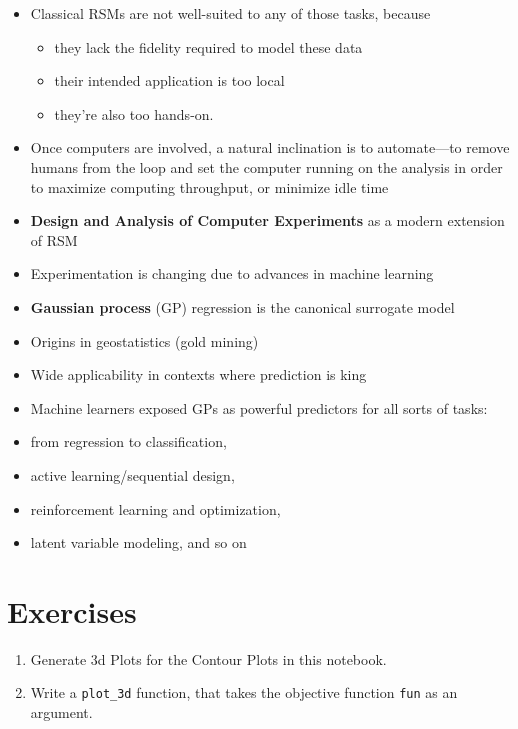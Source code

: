 \documentclass[
  letterpaper,
  DIV=11,
  numbers=noendperiod]{scrreprt}
\providecommand{\tightlist}{%
  \setlength{\itemsep}{0pt}\setlength{\parskip}{0pt}}\usepackage{longtable,booktabs,array}
\begin{document}
\begin{itemize}
\tightlist
\item
  Classical RSMs are not well-suited to any of those tasks, because

  \begin{itemize}
  \tightlist
  \item
    they lack the fidelity required to model these data
  \item
    their intended application is too local
  \item
    they're also too hands-on.
  \end{itemize}
\item
  Once computers are involved, a natural inclination is to automate---to
  remove humans from the loop and set the computer running on the
  analysis in order to maximize computing throughput, or minimize idle
  time
\item
  \textbf{Design and Analysis of Computer Experiments} as a modern
  extension of RSM
\item
  Experimentation is changing due to advances in machine learning
\item
  \textbf{Gaussian process} (GP) regression is the canonical surrogate
  model
\item
  Origins in geostatistics (gold mining)
\item
  Wide applicability in contexts where prediction is king
\item
  Machine learners exposed GPs as powerful predictors for all sorts of
  tasks:
\item
  from regression to classification,
\item
  active learning/sequential design,
\item
  reinforcement learning and optimization,
\item
  latent variable modeling, and so on
\end{itemize}

\hypertarget{exercises-1}{%
\section{Exercises}\label{exercises-1}}

\begin{enumerate}
\def\labelenumi{\arabic{enumi}.}
\tightlist
\item
  Generate 3d Plots for the Contour Plots in this notebook.
\item
  Write a \texttt{plot\_3d} function, that takes the objective function
  \texttt{fun} as an argument.
\end{enumerate}
\end{document}
